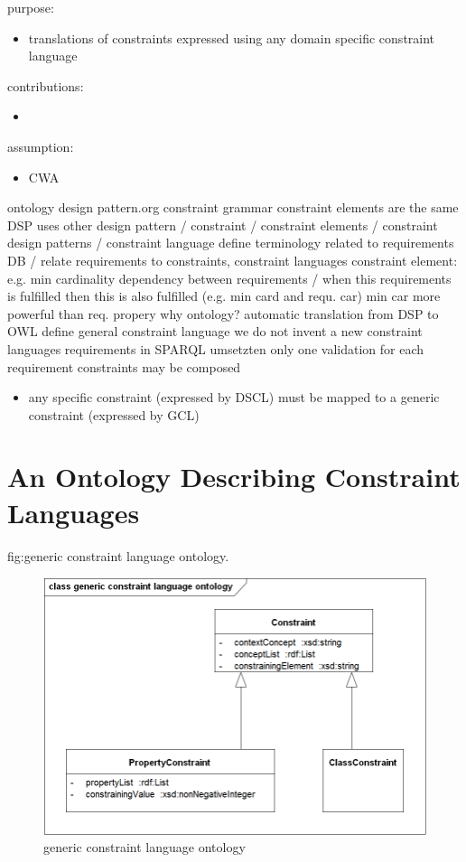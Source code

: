 \documentclass{llncs}
\begin{document}
purpose:
\begin{itemize}
	\item translations of constraints expressed using any domain specific constraint language
\end{itemize}

contributions:
\begin{itemize}
	\item 
\end{itemize}

assumption:
\begin{itemize}
	\item CWA
\end{itemize}


ontology design pattern.org
constraint grammar
constraint elements are the same
DSP uses other design pattern / 
constraint / constraint elements / constraint design patterns / constraint language
define terminology
related to requirements DB / relate requirements to constraints, constraint languages
constraint element: e.g. min cardinality
dependency between requirements / when this requirements is fulfilled then this is also fulfilled (e.g. min card and requ. car)
min car more powerful than req. propery
why ontology? automatic translation from DSP to OWL 
define general constraint language
we do not invent a new constraint languages
requirements in SPARQL umsetzten
only one validation for each requirement
constraints may be composed 

\begin{itemize}
	\item any specific constraint (expressed by DSCL) must be mapped to a generic constraint (expressed by GCL)
\end{itemize}

\section{An Ontology Describing Constraint Languages} 

fig:generic constraint language ontology.  
\begin{figure}
	\centering
		\includegraphics[width=1.00\textwidth]{generic constraint language ontology/generic constraint language ontology.png}
	\caption{generic constraint language ontology}
	\label{fig:generic constraint language ontology}
\end{figure}
\end{document}
